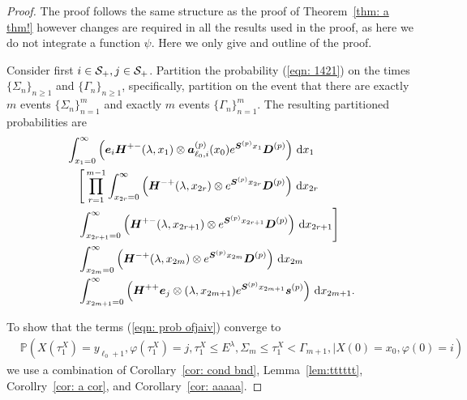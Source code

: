 \begin{proof}
	The proof follows the same structure as the proof of Theorem~\ref{thm: a thm!} however changes are required in all the results used in the proof, as here we do not integrate a function \(\psi\). Here we only give and outline of the proof. 

	Consider first \(i\in \mathcal{S}_+,j\in\mathcal{S}_+\). Partition the probability (\ref{eqn: 1421}) on the times \(\{\Sigma_n\}_{n\geq 1}\) and \(\{\Gamma_n\}_{n\geq 1}\), specifically, partition on the event that there are exactly \(m\) events \(\{\Sigma_n\}_{n=1}^m\) and exactly \(m\) events \(\{\Gamma_n\}_{n=1}^m\). %
	The resulting partitioned probabilities are
	\begin{align}
                 &\int_{x_1=0}^\infty \left(\boldsymbol e_i\boldsymbol H^{+-}(\lambda,x_1)\otimes \boldsymbol a_{\ell_0,i}^{(p)}(x_0)e^{\boldsymbol{S}^{(p)}x_1}\boldsymbol{D}^{(p)}\right)\, \mathrm{d} x_1 \nonumber
            	\\&\nonumber \quad \Bigg[\prod_{r=1}^{m-1} \int_{x_{2r}=0}^\infty \left(\boldsymbol H^{-+}(\lambda,x_{2r}) \otimes e^{\boldsymbol{S}^{(p)}x_{2r}}\boldsymbol D^{(p)}\right)\, \mathrm{d} x_{2r} \\&\quad \int_{x_{2r+1}=0}^\infty \left(\boldsymbol H^{+-}(\lambda,x_{2r+1}) \otimes e^{\boldsymbol{S}^{(p)}x_{2r+1}}\boldsymbol D^{(p)}\right) \, \mathrm{d} x_{2r+1}\Bigg] \nonumber
            	\\&
            	\quad \int_{x_{2m}=0}^\infty \left(\boldsymbol H^{-+}(\lambda, x_{2m}) \otimes e^{\boldsymbol{S}^{(p)}x_{2m}}\boldsymbol{D}^{(p)}\right) \, \mathrm{d} x_{2m} \nonumber
				\\&\quad \int_{x_{2m+1}=0}^\infty \left( \boldsymbol H^{++}\boldsymbol e_j \otimes (\lambda,x_{2m+1}) e^{\boldsymbol{S}^{(p)}x_{2m+1}}\boldsymbol s^{(p)} \right) \, \mathrm{d} x_{2m+1}.  \label{eqn: prob ofjaiv}
	\end{align}

	To show that the terms (\ref{eqn: prob ofjaiv}) converge to 
	\begin{align}
		&\mathbb P(X(\tau_1^X)=y_{\ell_0+1},\varphi(\tau_1^X)=j,\tau_1^X\leq E^\lambda, \Sigma_{m}\leq \tau_1^X<\Gamma_{m+1}, \mid X(0)=x_0, \varphi(0)=i)
	\end{align}
	we use a combination of Corollary~\ref{cor: cond bnd}, Lemma~\ref{lem:tttttt}, Corollry~\ref{cor: a cor}, and Corollary~\ref{cor: aaaaa}.

	

\end{proof}
